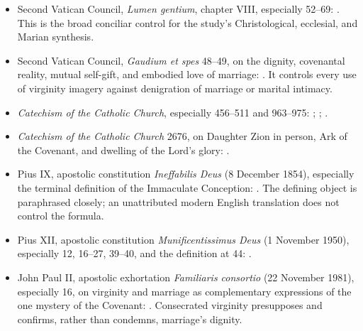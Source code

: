 \begin{itemize}
  \item Second Vatican Council, \emph{Lumen gentium}, chapter VIII, especially 52--69: .  This is the broad conciliar control for the study's Christological, ecclesial, and Marian synthesis.
  \item Second Vatican Council, \emph{Gaudium et spes} 48--49, on the dignity, covenantal reality, mutual self-gift, and embodied love of marriage: .  It controls every use of virginity imagery against denigration of marriage or marital intimacy.
  \item \emph{Catechism of the Catholic Church}, especially 456--511 and 963--975: ; ; .
  \item \emph{Catechism of the Catholic Church} 2676, on Daughter Zion in person, Ark of the Covenant, and dwelling of the Lord's glory: .
  \item Pius IX, apostolic constitution \emph{Ineffabilis Deus} (8 December 1854), especially the terminal definition of the Immaculate Conception: .  The defining object is paraphrased closely; an unattributed modern English translation does not control the formula.
  \item Pius XII, apostolic constitution \emph{Munificentissimus Deus} (1 November 1950), especially 12, 16--27, 39--40, and the definition at 44: .
  \item John Paul II, apostolic exhortation \emph{Familiaris consortio} (22 November 1981), especially 16, on virginity and marriage as complementary expressions of the one mystery of the Covenant: .  Consecrated virginity presupposes and confirms, rather than condemns, marriage's dignity.

\end{itemize}

